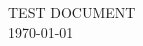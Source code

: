 \documentclass{article}
\begin{document}
\begin{center}
{\Large TEST DOCUMENT}\\
\today
\end{center}
\end{document}
